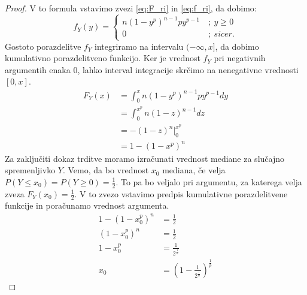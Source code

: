 \documentclass[12pt,a4paper,twoside]{article}
\theoremstyle{definition} %
\theoremstyle{plain} %
\newtheorem{trditev}[definicija]{Trditev}
\numberwithin{equation}{section}  %
\begin{document}
\begin{proof}
	V to formula vstavimo zvezi \ref{eq:F_ri} in \ref{eq:f_ri}, da dobimo:
	\begin{equation}
		f_Y(y) = 
		\begin{cases}
			n(1 - y^p)^{n-1} p y^{p-1}\ &;\ y \geq 0 \\
			0\ &;\ sicer.
		\end{cases} 
	\end{equation}
	Gostoto porazdelitve $f_Y$ integriramo na intervalu $(-\infty,x]$, da dobimo kumulativno porazdelitveno funkcijo.
	Ker je vrednost $f_Y$ pri negativnih argumentih enaka $0$, lahko interval integracije skrčimo na nenegativne vrednosti $[0,x]$.
	\begin{align*}
		F_Y(x) & = \int_0^x n(1 - y^p)^{n-1} p y^{p-1} dy \\
		& = \int_0^{x^p} n(1-z)^{n-1} dz \\
		& = -(1 - z)^n \Big|_0^{x^p} \\
		& = 1 - (1 - x^p)^n
	\end{align*}
	Za zaključiti dokaz trditve moramo izračunati vrednost mediane za slučajno spremenljivko $Y$.
	Vemo, da bo vrednost $x_0$ mediana, če velja $P(Y \leq x_0) = P(Y \geq 0) = \frac{1}{2}$.
	To pa bo veljalo pri argumentu, za katerega velja zveza $F_Y(x_0) = \frac{1}{2}$.
	V to zvezo vstavimo predpis kumulativne porazdelitvene funkcije in poračunamo vrednost argumenta.
	\begin{align*}
		1 - (1 - x_0^p)^n & = \frac{1}{2} \\
		(1 - x_0^p)^n & = \frac{1}{2} \\
		1 - x_0^p & = \frac{1}{2^{\frac{1}{n}}} \\
		x_0 & = (1 - \frac{1}{2^{\frac{1}{n}}})^{\frac{1}{p}}
	\end{align*}
\end{proof}



\end{document}
